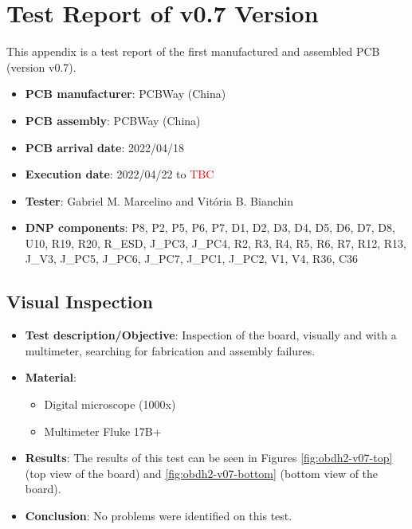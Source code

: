 %
%
%
%
%

%
%
%
%
%

\chapter{Test Report of v0.7 Version} \label{anx:test-report-v07}

This appendix is a test report of the first manufactured and assembled PCB (version v0.7).

\begin{itemize}
    \item \textbf{PCB manufacturer}: PCBWay (China)
    \item \textbf{PCB assembly}: PCBWay (China)
    \item \textbf{PCB arrival date}: 2022/04/18
    \item \textbf{Execution date}: 2022/04/22 to \textcolor{red}{TBC}
    \item \textbf{Tester}: Gabriel M. Marcelino and Vitória B. Bianchin
    \item \textbf{DNP components}: P8, P2, P5, P6, P7, D1, D2, D3, D4, D5, D6, D7, D8, U10, R19, R20, R\_ESD, J\_PC3, J\_PC4, R2, R3, R4, R5, R6, R7, R12, R13, J\_V3, J\_PC5, J\_PC6, J\_PC7, J\_PC1, J\_PC2, V1, V4, R36, C36
\end{itemize}

\section{Visual Inspection}

\begin{itemize}
    \item \textbf{Test description/Objective}: Inspection of the board, visually and with a multimeter, searching for fabrication and assembly failures.
    \item \textbf{Material}:
        \begin{itemize}
            \item Digital microscope (1000x)
            \item Multimeter Fluke 17B+
        \end{itemize}
    \item \textbf{Results}: The results of this test can be seen in Figures \ref{fig:obdh2-v07-top} (top view of the board) and \ref{fig:obdh2-v07-bottom} (bottom view of the board).
    \item \textbf{Conclusion}: No problems were identified on this test.
\end{itemize}

